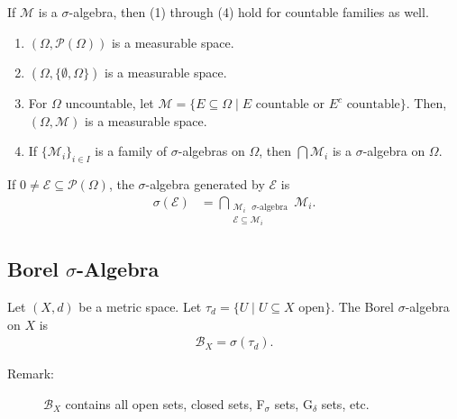 \documentclass[9pt]{extarticle}
\begin{document}
  If $\mathcal{M}$ is a $\sigma$-algebra, then (1) through (4) hold for countable families as well.
  \begin{enumerate}[(1)]
    \item $(\Omega,\mathcal{P}(\Omega))$ is a measurable space.
    \item $(\Omega,\{\emptyset,\Omega\})$ is a measurable space.
    \item For $\Omega$ uncountable, let $\mathcal{M} = \{E\subseteq \Omega\mid E\text{ countable or }E^c\text{ countable}\}$. Then, $(\Omega,\mathcal{M})$ is a measurable space.
    \item If $\{\mathcal{M}_i\}_{i\in I}$ is a family of $\sigma$-algebras on $\Omega$, then $\bigcap \mathcal{M}_i$ is a $\sigma$-algebra on $\Omega$.
  \end{enumerate}
  If $0\neq \mathcal{E}\subseteq \mathcal{P}(\Omega)$, the $\sigma$-algebra generated by $\mathcal{E}$ is
  \begin{align*}
    \sigma(\mathcal{E}) &= \bigcap_{\substack{\mathcal{M}_i\text{ $\sigma$-algebra}\\\mathcal{E}\subseteq \mathcal{M}_i}}\mathcal{M}_i.
  \end{align*}
  \subsection{Borel $\sigma$-Algebra}%
  Let $(X,d)$ be a metric space. Let $\tau_d = \{U\mid U\subseteq X\text{ open}\}$. The Borel $\sigma$-algebra on $X$ is
  \begin{align*}
    \mathcal{B}_X = \sigma(\tau_d).
  \end{align*}
  \begin{description}
    \item[Remark:] $\mathcal{B}_X$ contains all open sets, closed sets, F$_{\sigma}$ sets, G$_{\delta}$ sets, etc.
  \end{description}
\end{document}
